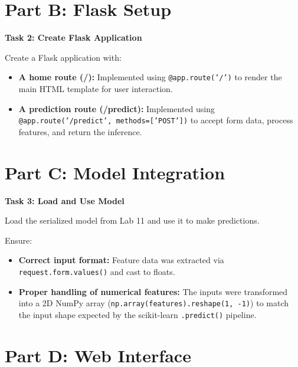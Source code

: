 \documentclass[12pt,a4paper]{article}
\begin{document}
\section*{Part B: Flask Setup}

\begin{tcolorbox}
\textbf{Task 2: Create Flask Application}

Create a Flask application with:
\begin{itemize}
\item \textbf{A home route (/):} Implemented using \texttt{@app.route('/')} to render the main HTML template for user interaction.
\item \textbf{A prediction route (/predict):} Implemented using \texttt{@app.route('/predict', methods=['POST'])} to accept form data, process features, and return the inference.
\end{itemize}

\end{tcolorbox}


\section*{Part C: Model Integration}

\begin{tcolorbox}
\textbf{Task 3: Load and Use Model}

Load the serialized model from Lab 11 and use it to make predictions.

Ensure:
\begin{itemize}
\item \textbf{Correct input format:} Feature data was extracted via \texttt{request.form.values()} and cast to floats.
\item \textbf{Proper handling of numerical features:} The inputs were transformed into a 2D NumPy array (\texttt{np.array(features).reshape(1, -1)}) to match the input shape expected by the scikit-learn \texttt{.predict()} pipeline.
\end{itemize}

\end{tcolorbox}


\section*{Part D: Web Interface}
\end{document}
